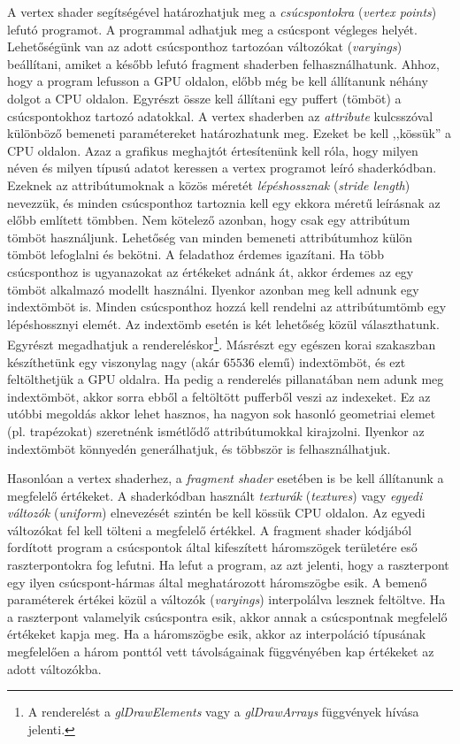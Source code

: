 \documentclass[12pt]{report}
\theoremstyle{definition}
\newcommand{\inenglish}[1]{\textsl{#1}}
\newcommand{\func}[1]{{\textsl{#1}}}
\begin{document}
A vertex shader segítségével határozhatjuk meg a \emph{csúcspontokra}
(\inenglish{vertex points}) lefutó programot. A programmal adhatjuk meg a
csúcspont végleges helyét.  Lehetőségünk van az adott csúcsponthoz tartozóan
változókat (\inenglish{varyings}) beállítani, amiket a később lefutó fragment
shaderben felhasználhatunk. Ahhoz, hogy a program lefusson a GPU oldalon, előbb
még be kell állítanunk néhány dolgot a CPU oldalon. Egyrészt össze kell állítani
egy puffert (tömböt) a csúcspontokhoz tartozó adatokkal. A vertex shaderben az
\func{attribute} kulcsszóval különböző bemeneti paramétereket határozhatunk meg.
Ezeket be kell ,,kössük'' a CPU oldalon. Azaz a grafikus meghajtót értesítenünk
kell róla, hogy milyen néven és milyen típusú adatot keressen a vertex programot
leíró shaderkódban. Ezeknek az attribútumoknak a közös méretét
\emph{lépéshossznak} (\inenglish{stride length}) nevezzük, és minden
csúcsponthoz tartoznia kell egy ekkora méretű leírásnak az előbb említett
tömbben. Nem kötelező azonban, hogy csak egy attribútum tömböt használjunk.
Lehetőség van minden bemeneti attribútumhoz külön tömböt lefoglalni és bekötni.
A feladathoz érdemes igazítani. Ha több csúcsponthoz is ugyanazokat az értékeket
adnánk át, akkor érdemes az egy tömböt alkalmazó modellt használni.  Ilyenkor
azonban meg kell adnunk egy indextömböt is. Minden csúcsponthoz hozzá kell
rendelni az attribútumtömb egy lépéshossznyi elemét. Az indextömb esetén is két
lehetőség közül választhatunk. Egyrészt megadhatjuk a rendereléskor\footnote{A
renderelést a \func{glDrawElements} vagy a \func{glDrawArrays} függvények hívása
jelenti.}.  Másrészt egy egészen korai szakaszban készíthetünk egy viszonylag
nagy (akár $65536$ elemű) indextömböt, és ezt feltölthetjük a GPU oldalra. Ha
pedig a renderelés pillanatában nem adunk meg indextömböt, akkor sorra ebből a
feltöltött pufferből veszi az indexeket. Ez az utóbbi megoldás akkor lehet
hasznos, ha nagyon sok hasonló geometriai elemet (pl. trapézokat) szeretnénk
ismétlődő attribútumokkal kirajzolni. Ilyenkor az indextömböt könnyedén
generálhatjuk, és többször is felhasználhatjuk.

Hasonlóan a vertex shaderhez, a \emph{fragment shader} esetében is be kell
állítanunk a megfelelő értékeket. A shaderkódban használt \emph{texturák}
(\inenglish{textures}) vagy \emph{egyedi változók} (\inenglish{uniform})
elnevezését szintén be kell kössük CPU oldalon. Az egyedi változókat fel kell
tölteni a megfelelő értékkel. A fragment shader kódjából fordított program a
csúcspontok által kifeszített háromszögek területére eső raszterpontokra fog
lefutni.  Ha lefut a program, az azt jelenti, hogy a raszterpont egy ilyen
csúcspont-hármas által meghatározott háromszögbe esik. A bemenő paraméterek
értékei közül a változók (\inenglish{varyings}) interpolálva lesznek feltöltve.
Ha a raszterpont valamelyik csúcspontra esik, akkor annak a csúcspontnak
megfelelő értékeket kapja meg. Ha a háromszögbe esik, akkor az interpoláció
típusának megfelelően a három ponttól vett távolságainak függvényében kap
értékeket az adott változókba.
\end{document}
